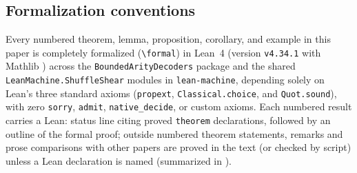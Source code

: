 \subsection{Formalization conventions}\label{sec:conventions}

Every numbered theorem, lemma, proposition, corollary, and example in this paper is completely
formalized (\verb|\formal|) in Lean~4 (version \texttt{v4.34.1} with Mathlib \cite{Mathlib2026}) across
the \texttt{BoundedArityDecoders} package and the shared \texttt{LeanMachine.ShuffleShear} modules in
\texttt{lean-machine}, depending solely on Lean's three standard axioms (\texttt{propext},
\texttt{Classical.choice}, and \texttt{Quot.sound}), with zero \texttt{sorry}, \texttt{admit},
\texttt{native\_decide}, or custom axioms. Each numbered result carries a \textsf{Lean:} status line
citing proved \texttt{theorem} declarations, followed by an outline of the formal proof; outside
numbered theorem statements, remarks and prose comparisons with other papers are proved in the text (or
checked by script) unless a Lean declaration is named (summarized in ).
